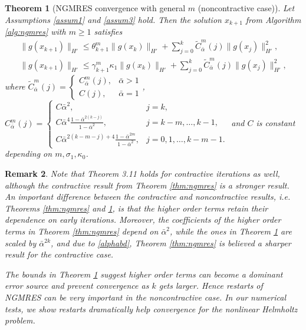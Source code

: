 \documentclass{article}
\numberwithin{equation}{section}
\newtheorem{thm}{Theorem}[section]
\newtheorem{remark}[thm]{Remark}
\begin{document}
\begin{thm}[NGMRES convergence with general $m$ (noncontractive case)]
\label{thm:ngmres2}
  Let Assumptions \ref{assum1} and \ref{assum3} hold.  Then the solution $x_{k+1}$ from Algorithm \ref{alg:ngmres} with $m\ge1$ satisfies 
     \begin{align}
     \label{eq:gx1m}
        \| g(x_{k+1})\|_{H'} \le \theta^m_{k+1} \|g(x_k)\|_{H'} +  \sum\limits_{j=0}^k \widetilde C^m_{\bar\alpha}(j)\|g(x_j)\|_{H'}^2, \\
         \| g(x_{k+1})\|_{H'} \le \gamma^m_{k+1} \kappa_1 \|g(x_k)\|_{H'} +   \sum\limits_{j=0}^k \widetilde C^m_{\bar\alpha}(j)\|g(x_j)\|_{H'}^2,
         \label{eq:gx2m}
    \end{align}   
     where $\widetilde C^m_{\bar\alpha}(j)= \left\{ \begin{array}{ll}
     C_{\bar\alpha}^{m}(j), & \bar\alpha>1 \\ 
      C(j), & \bar\alpha=1 \end{array} \right.$, $C_{\bar\alpha}^m(j) =  \left\{ \begin{array}{ll} C\bar\alpha^2 , & j=k, \\[8pt]
		C\bar\alpha^{4}\frac{1-\bar\alpha^{2(k-j)}}{1-\bar\alpha^2}, & j = k-m,\dots, k-1,\\[8pt]     
      C\bar\alpha^{2(k-m-j)+4}\frac{1-\bar\alpha^{2m}}{1-\bar\alpha^2}, & j = 0,1,\dots, k-m-1. \end{array}\right. $ and  $C$ is constant depending on $m,\sigma_1, \kappa_0$.
\end{thm}
\begin{remark}\label{rmk:con-noncon} 
Note that Theorem 3.11 holds for contractive iterations as well, although the contractive result from Theorem \ref{thm:ngmres} is a stronger result.  An important difference between the contractive and noncontractive results, i.e. Theorems \ref{thm:ngmres} and \ref{thm:ngmres2}, is that the higher order terms retain their dependence on early iterations. Moreover, the coefficients of the higher order terms in Theorem \ref{thm:ngmres} depend on $\bar\alpha^2$, while the ones in Theorem \ref{thm:ngmres2} are scaled by $\bar\alpha^{2k}$, and due to  \eqref{alphabd}, Theorem \ref{thm:ngmres} is believed a sharper result for the contractive case. 

The bounds in Theorem \ref{thm:ngmres2} suggest higher order terms can become a dominant error source and prevent convergence as $k$ gets larger.  Hence restarts of NGMRES can be very important in the noncontractive case. In our numerical tests, we show restarts dramatically help convergence for the nonlinear Helmholtz problem.
\end{remark}
\end{document}
